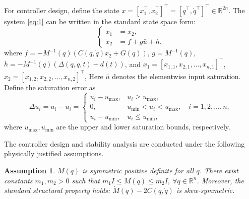 \documentclass[pdflatex,sn-mathphys-num]{sn-jnl}%
\theoremstyle{thmstyleone}%
\newtheorem{assumption}{Assumption}
\theoremstyle{thmstyletwo}%
\theoremstyle{thmstylethree}%
\begin{document}
For controller design, define the state $x = [x_1^{\top},x_2^{\top}]^{\top} = [q^{\top},\dot{q}^{\top}]^{\top} \in \mathbb{R}^{2n}$. The system \cref{eq:1} can be written in the standard state space form:
\begin{equation}
	\left\{
	\begin{aligned}
		\dot{x}_1 & = x_2,     \\
		\dot{x}_2 & =f +g \bar{u} +h,
	\end{aligned}
	\right.
	\label{eq:2}
\end{equation}
where $f=-M^{-1}(q) (C(q,\dot{q})x_2 + G(q)) $, $g=M^{-1}(q)$, $h=-M^{-1}(q)(\Delta(q,\dot{q},t) - d(t))$, and $x_1=[x_{1,1},x_{2,1},...,x_{n,1}]^{\top}$, $x_2=[x_{1,2},x_{2,2},...,x_{n,2}]^{\top}$, Here $\bar{u}$ denotes the elementwise input saturation. Define the saturation error as
\begin{equation}\label{eq:3}
\Delta u_{i} =  u_{i}-\bar{u}_{i}=\begin{cases} 
	u_{i}-u_{\max}, & u_i \geq u_{\max}, \\
0,       & u_{\min} < u_i < u_{\max},  \quad i=1,2,...,n,\\
u_{i}-u_{\min}, & u_i \leq u_{\min},
\end{cases}
\end{equation}
where $u_{\max},u_{\min}$ are the upper and lower saturation bounds, respectively.

\par The controller design and stability analysis are conducted under the following physically justified assumptions.
\begin{assumption}\cite{Spong_2022_historicalperspective}   \label{assumption:1}
	$M(q)$ is symmetric positive definite for all $q$. There exist constants $m_1,m_2>0$ such that
	$m_1 I \le M(q) \le m_2 I,\ \forall q\in\mathbb{R}^n$.
	Moreover, the standard structural property holds: $\dot M(q)-2C(q,\dot q)$ is skew-symmetric.
	\end{assumption}
	
\end{document}
